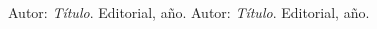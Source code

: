 

\begin{thebibliography}{99}

 Autor: \textit{Título}. Editorial, año.
 Autor: \textit{Título}. Editorial, año.


\end{thebibliography}